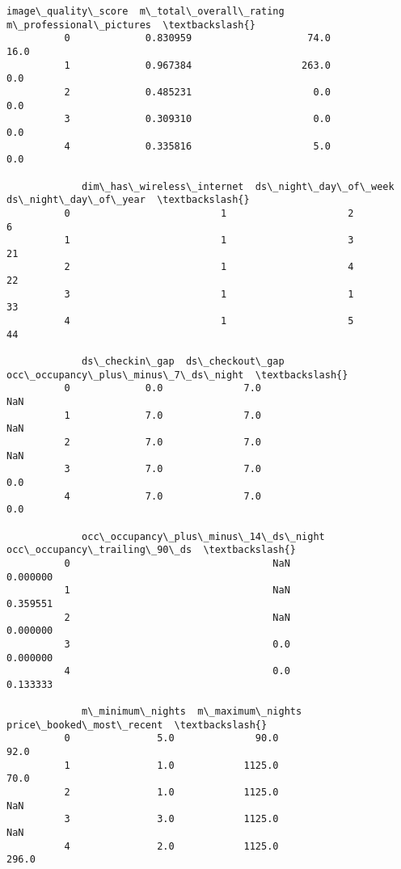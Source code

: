 \documentclass[11pt]{article}
\begin{document}
\begin{Verbatim}[commandchars=\\\{\}]
             image\_quality\_score  m\_total\_overall\_rating  m\_professional\_pictures  \textbackslash{}
          0             0.830959                    74.0                     16.0   
          1             0.967384                   263.0                      0.0   
          2             0.485231                     0.0                      0.0   
          3             0.309310                     0.0                      0.0   
          4             0.335816                     5.0                      0.0   
          
             dim\_has\_wireless\_internet  ds\_night\_day\_of\_week  ds\_night\_day\_of\_year  \textbackslash{}
          0                          1                     2                     6   
          1                          1                     3                    21   
          2                          1                     4                    22   
          3                          1                     1                    33   
          4                          1                     5                    44   
          
             ds\_checkin\_gap  ds\_checkout\_gap  occ\_occupancy\_plus\_minus\_7\_ds\_night  \textbackslash{}
          0             0.0              7.0                                  NaN   
          1             7.0              7.0                                  NaN   
          2             7.0              7.0                                  NaN   
          3             7.0              7.0                                  0.0   
          4             7.0              7.0                                  0.0   
          
             occ\_occupancy\_plus\_minus\_14\_ds\_night  occ\_occupancy\_trailing\_90\_ds  \textbackslash{}
          0                                   NaN                      0.000000   
          1                                   NaN                      0.359551   
          2                                   NaN                      0.000000   
          3                                   0.0                      0.000000   
          4                                   0.0                      0.133333   
          
             m\_minimum\_nights  m\_maximum\_nights  price\_booked\_most\_recent  \textbackslash{}
          0               5.0              90.0                      92.0   
          1               1.0            1125.0                      70.0   
          2               1.0            1125.0                       NaN   
          3               3.0            1125.0                       NaN   
          4               2.0            1125.0                     296.0   
          

\end{Verbatim}
\end{document}

